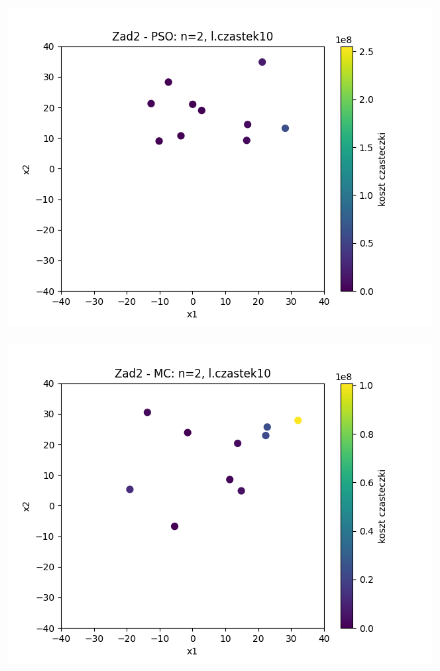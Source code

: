 \documentclass[11pt, a4paper, oneside]{article}
\begin{document}
\begin{figure}[H]
\centering
\begin{minipage}[b]{\dimexpr.5\textwidth-1em}
  \centering
  \includegraphics[width=1\linewidth]{grafiki/Wykresy2d/PSO_Zad2_startPositions.png}
  \label{fig:pozycjeStartowe:PSO2}
\end{minipage} \hfill
\begin{minipage}[b]{\dimexpr.5\textwidth-1em}
  \centering
  \includegraphics[width=1\linewidth]{grafiki/Wykresy2d/MC_Zad2_startPositions.png}
  \label{fig:pozycjeStartowe:MC2}
\end{minipage}
\end{figure}
\end{document}

